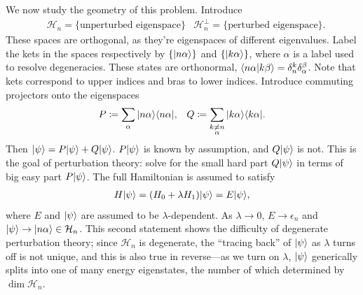 \documentclass[11pt]{article}
\begin{document}
We now study the geometry of this problem. Introduce
\begin{align*}
    & \mathcal{H}_n = \{ \text{unperturbed eigenspace} \}
    & \mathcal{H}_n^\perp = \{ \text{perturbed eigenspace} \}.
\end{align*}
These spaces are orthogonal, as they're eigenspaces of different
eigenvalues. Label the kets in the spaces respectively by $\{ \lvert n\alpha\rangle \}$ and 
$\{ \lvert k \alpha\rangle \}$, where $\alpha$ is a label used to resolve 
degeneracies. These states are orthonormal, $\langle n\alpha | k\beta \rangle = \delta^{k}_n \delta^{\beta}_\alpha$.
Note that kets correspond to upper indices and bras to lower indices.
Introduce commuting projectors onto the eigenspaces
\begin{align*}
    & P \coloneqq \sum_{\alpha}
    | n\alpha \rangle \langle n\alpha |,
    & Q \coloneqq \sum_{\substack{k \neq n \\ \alpha}} | k\alpha \rangle \langle k\alpha |.
\end{align*}
Then $\lvert\psi\rangle = P \lvert\psi\rangle + Q \lvert\psi\rangle$. $P\lvert\psi\rangle$ is known by assumption,
and $Q\lvert\psi\rangle$ is not. This is the goal of perturbation theory: solve for the small hard part
$Q\lvert\psi\rangle$ in terms of big easy part $P\lvert\psi\rangle$. The full Hamiltonian is assumed
to satisfy
\begin{align}
    \label{eq:PTenergyEvals}
    H \lvert\psi\rangle = (H_0 + \lambda H_1)\lvert\psi\rangle = E \lvert\psi\rangle,
\end{align}
where $E$ and $\lvert\psi\rangle$ are assumed to be $\lambda$-dependent. As $\lambda \to 0$,
$E \to \epsilon_n$ and $\lvert\psi\rangle \to \lvert n\alpha\rangle \in \mathcal{H}_n$. This second
statement shows the difficulty of degenerate perturbation theory; since $\mathcal{H}_n$
is degenerate, the ``tracing back'' of $\lvert\psi\rangle$ as $\lambda$ turns off is not unique,
and this is also true in reverse---as we turn on $\lambda$, $\lvert\psi\rangle$ generically splits
into one of many energy eigenstates, the number of which determined by $\dim{\mathcal{H}_n}$.
\end{document}
